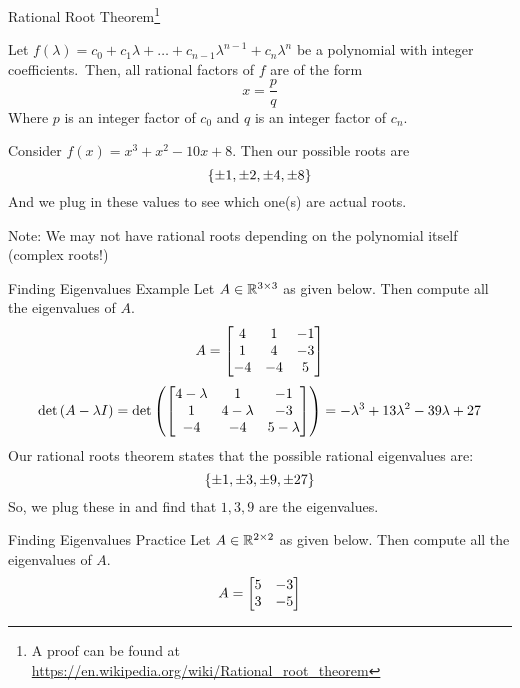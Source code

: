 \documentclass[xcoler=dvipsnames, aspectratio=169]{beamer}
\begin{document}
    \begin{frame}{Rational Root Theorem\footnote{A proof can be found at 
        \url{https://en.wikipedia.org/wiki/Rational_root_theorem}}}
        \footnotesize
        \begin{theorem}
            Let $f(\lambda) = c_0 + c_1\lambda + \dots + c_{n-1}\lambda^{n-1} + c_n\lambda^n$ 
            be a polynomial with integer coefficients.\pause\ Then, all rational factors of $f$ 
            are of the form
            \[
                x = \frac{p}{q}
            \]
            Where $p$ is an integer factor of $c_0$ and $q$ is an integer factor of $c_n$.
        \end{theorem}\pause
        \begin{example}
            Consider $f(x) = x^3+x^2-10x+8$. Then our possible roots are
            \[
                \left\{\pm 1, \pm 2, \pm 4, \pm 8\right\}
            \]
            And we plug in these values to see which one(s) are actual roots. 
        \end{example}
        Note: We may not have rational roots depending on the polynomial itself (complex roots!)
    \end{frame}
    \begin{frame}{Finding Eigenvalues Example}
        \small
        Let $A\in\mathbb{R}^{3\times 3}$ as given below. Then compute all the eigenvalues of $A$.
        \[
            A = \begin{bmatrix}
                4 & 1 &-1\\
                1 & 4 &-3\\
                -4&-4 & 5
            \end{bmatrix}
        \]\pause
        \[
            \det{A-\lambda I} = \det{\bMat{
                4-\lambda & 1 &-1\\
                1 & 4-\lambda &-3\\
                -4&-4 & 5-\lambda
            }} = -\lambda^3 +13\lambda^2 -39\lambda + 27 
        \]\pause
        Our rational roots theorem states that the possible rational eigenvalues are:
        \[
            \left\{\pm 1, \pm 3, \pm 9, \pm 27\right\}
        \]
        So, we plug these in and find that $1,3,9$ are the eigenvalues.
    \end{frame}
    \begin{frame}{Finding Eigenvalues Practice}
        Let $A\in\mathbb{R}^{2\times 2}$ as given below. Then compute all the eigenvalues of $A$.
        \[
            A = \begin{bmatrix}
                5 & -3\\
                3 & -5
            \end{bmatrix}
        \]
        \iftoggle{showSolutions}{
            \pause
            \[
                f(\lambda) = \lambda^2 - 16
            \]
            which has roots\pause
            \[
                \lambda=\pm 4
            \]
        }{\vspace{130pt}}
    \end{frame}
\end{document}
